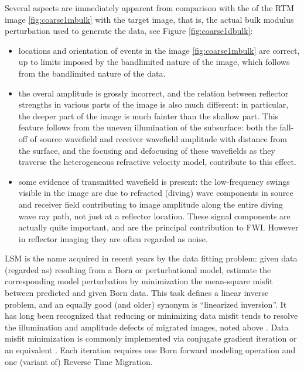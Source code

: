 Several aspects are immediately apparent from comparison with the of
the RTM image \ref{fig:coarse1mbulk} with the target image, that is,
the actual bulk modulus perturbation used to generate the data, see
Figure \ref{fig:coarse1dbulk}:
\begin{itemize}
\item locations and orientation of events in the image
  \ref{fig:coarse1mbulk} are correct, up to limits imposed by the bandlimited
  nature of the image, which follows from the bandlimited nature of
  the data.
\item the overal amplitude is grossly incorrect, and the relation
  between reflector strengths in various parts of the image is also
  much different: in particular, the deeper part of the image is much
  fainter than the shallow part. This feature follows from the uneven
  illumination of the subsurface: both the fall-off of source
  wavefield and receiver wavefield amplitude with distance from the
  surface, and the focusing and defocusing of these wavefields as they
  traverse the heterogeneous refractive velocity model, contribute to
  this effect.
\item some evidence of transmitted wavefield is present: the
  low-frequency swings visible in the image are due to refracted
  (diving) wave components in source and receiver field contributing
  to image amplitude along the entire diving wave ray path, not just
  at a reflector location. These signal components are actually quite
  important, and are the principal contribution to FWI. However in
  reflector imaging they are often regarded as noise.
\end{itemize}


LSM is the name acquired in recent years by the data fitting problem:
given data (regarded as) resulting from a Born or perturbational
model, estimate the corresponding model perturbation by minimization
the mean-square misfit between predicted and given Born data. This
task defines a linear inverse problem, and an equally good (and older)
synonym is ``linearized inversion''. It has long been recognized that
reducing or minimizing data misfit tends to resolve the illumination
and amplitude defects of migrated images, noted above
\cite[]{BourJiaLai:89}.  Data misfit minimization is commonly
implemented via conjugate gradient iteration or an equivalent
\cite[]{Nemeth:99}. Each iteration requires one Born forward modeling
operation and one (variant of) Reverse Time Migration.

